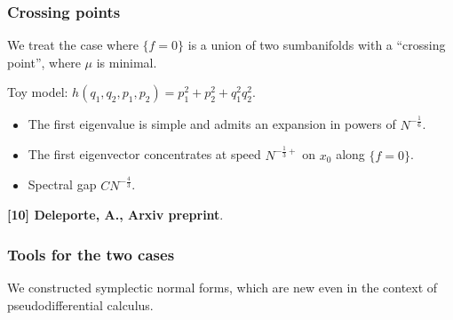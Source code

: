 \documentclass[mathserif]{beamer}
\begin{document}
\begin{frame}
  \frametitle{Crossing points}
  We treat the case where $\{f=0\}$ is a union of two sumbanifolds
  with a ``crossing point'', where $\mu$ is minimal.

  Toy model: $h(q_1,q_2,p_1,p_2)=p_1^2+p_2^2+q_1^2q_2^2$.
  
    \begin{itemize}
    \item The first eigenvalue is simple and admits an expansion in
      powers of $N^{-\frac 16}$.
    \item The first eigenvector concentrates  at speed $N^{-\frac 13+}$ on $x_0$ along
      $\{f=0\}$.
    \item Spectral gap $CN^{-\frac 43}$.
    \end{itemize}
    \vspace{2em}
    
\small{{\bfseries [10] Deleporte, A., Arxiv preprint}.}
\end{frame}

\begin{frame}
  \frametitle{Tools for the two cases}
  We constructed symplectic normal forms, which are new even in the
  context of pseudodifferential calculus.

\end{frame}
\end{document}
